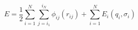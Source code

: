 


$$
E = \frac{1}{2} \sum_{i=1}^{N} \sum_{j=i_1}^{i_N} \phi_{ij} \left(r_{ij}\right) + \sum_{i=1}^{N}E_i\left(q_i,\sigma_i\right)
$$


